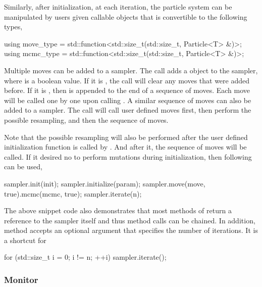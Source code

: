 Similarly, after initialization, at each iteration, the particle system can be
manipulated by users given callable objects that is convertible to the
following types,
\begin{cppcode}
  using move_type = std::function<std::size_t(std::size_t, Particle<T> &)>;
  using mcmc_type = std::function<std::size_t(std::size_t, Particle<T> &)>;
\end{cppcode}
Multiple moves can be added to a sampler. The call
 adds a  object to
the sampler, where  is a boolean value. If it is
, the call will clear any moves that were added before. If it
is , then  is appended to the end of a sequence
of moves. Each move will be called one by one upon calling
. A similar sequence of \mcmc moves can also be
added to a sampler. The call  will call user
defined moves first, then perform the possible resampling, and then the
sequence of \mcmc moves.

Note that the possible resampling will also be performed after the user defined
initialization function is called by . And
after it, the sequence of \mcmc moves will be called. If it desired no to
perform mutations during initialization, then following can be used,
\begin{cppcode}
  sampler.init(init);
  sampler.initialize(param);
  sampler.move(move, true).mcmc(mcmc, true);
  sampler.iterate(n);
\end{cppcode}
The above snippet code also demonstrates that most methods of
 return a reference to the sampler itself and thus method
calls can be chained. In addition, method 
accepts an optional argument that specifies the number of iterations. It is a
shortcut for
\begin{cppcode}
  for (std::size_t i = 0; i != n; ++i)
  sampler.iterate();
\end{cppcode}

\subsubsection{Monitor}
\label{ssub:Monitor}

